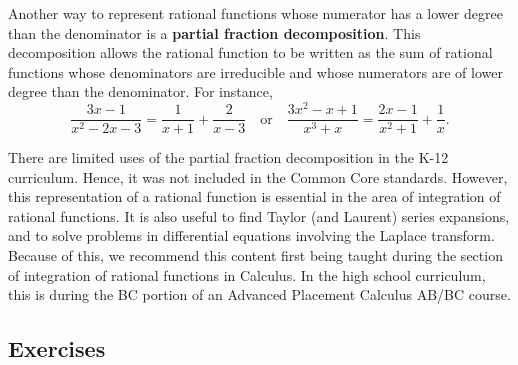 \documentclass[
]{book}
\theoremstyle{definition}
\theoremstyle{definition}
\theoremstyle{definition}
\theoremstyle{definition}
\theoremstyle{remark}
\begin{document}
Another way to represent rational functions whose numerator has a lower degree than the denominator is a \textbf{partial fraction decomposition}. This decomposition allows the rational function to be written as the sum of rational functions whose denominators are irreducible and whose numerators are of lower degree than the denominator. For instance,
\[\frac{3x-1}{x^2-2x-3} = \frac{1}{x+1} + \frac{2}{x-3}\quad \mbox{or} \quad \frac{3x^2-x+1}{x^3+x} = \frac{2x-1}{x^2+1} + \frac{1}{x}.\]

There are limited uses of the partial fraction decomposition in the K-12 curriculum. Hence, it was not included in the Common Core standards. However, this representation of a rational function is essential in the area of integration of rational functions. It is also useful to find Taylor (and Laurent) series expansions, and to solve problems in differential equations involving the Laplace transform. Because of this, we recommend this content first being taught during the section of integration of rational functions in Calculus. In the high school curriculum, this is during the BC portion of an Advanced Placement Calculus AB/BC course.

\hypertarget{exercises-33}{%
\subsection{Exercises}\label{exercises-33}}
\end{document}

